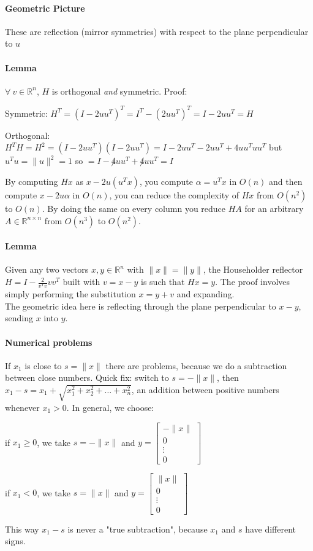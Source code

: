 \documentclass[10pt]{report}
\begin{document}
\paragraph{Geometric Picture} These are reflection (mirror symmetries) with respect to the plane perpendicular to $u$
\paragraph{Lemma}$\forall\:v\in \mathbb{R}^n$, $H$ is orthogonal \textit{and} symmetric. Proof:
\begin{list}{}{}
	\item Symmetric: $H^T = (I-2uu^T)^T = I^T - (2uu^T)^T = I - 2uu^T = H$
	\item Orthogonal: $H^TH = H^2 = (I-2uu^T)(I-2uu^T) = I - 2uu^T - 2uu^T + 4uu^Tuu^T$ but $u^Tu = \|u\|^2 = 1$ so $= I - \not 4uu^T + \not 4uu^T = I$
\end{list}
By computing $Hx$ as $x - 2u(u^T x)$, you compute $\alpha = u^Tx$ in $O(n)$ and then compute $x-2u\alpha$ in $O(n)$, you can reduce the complexity of $Hx$ from $O(n^2)$ to $O(n)$. By doing the same on every column you reduce $HA$ for an arbitrary $A\in \mathbb{R}^{n\times n}$ from $O(n^3)$ to $O(n^2)$.
\paragraph{Lemma} Given any two vectors $x,y\in \mathbb{R}^n$ with $\|x\| = \|y\|$, the Householder reflector $H = I - \frac{2}{v^Tv}vv^T$ built with $v = x-y$ is such that $Hx = y$. The proof involves simply performing the substitution $x = y + v$ and expanding.\\
The geometric idea here is reflecting through the plane perpendicular to $x-y$, sending $x$ into $y$.
\paragraph{Numerical problems} If $x_1$ is close to $s = \|x\|$ there are problems, because we do a subtraction between close numbers. Quick fix: switch to $s = -\|x\|$, then $x_1 - s = x_1 + \sqrt{x_1^2+x_2^2+\ldots+x_n^2}$, an addition between positive numbers whenever $x_1 > 0$. In general, we choose:
\begin{list}{}{}
	\item if $x_1 \geq 0$, we take $s = -\|x\|$ and $y = \left[\begin{array}{c}
	-\|x\|\\0\\\vdots\\0
	\end{array}\right]$
	\item if $x_1 < 0$, we take $s = \|x\|$ and $y = \left[\begin{array}{c}
	\|x\|\\0\\\vdots\\0
	\end{array}\right]$
\end{list}
This way $x_1 - s$ is never a "true subtraction", because $x_1$ and $s$ have different signs.
\end{document}
